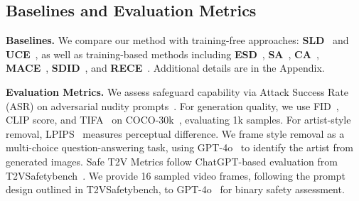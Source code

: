 
\subsection{Baselines and Evaluation Metrics} \textbf{Baselines.} We compare our method with training-free approaches: \textbf{SLD}~\citep{schramowski2023safe} and \textbf{UCE}~\citep{gandikota2024unified}, as well as training-based methods including \textbf{ESD}~\citep{gandikota2023erasing}, \textbf{SA}~\citep{heng2023selective}, \textbf{CA}~\citep{kumari2023ablating}, \textbf{MACE}~\citep{lu2024mace}, \textbf{SDID}~\citep{li2024self}, and \textbf{RECE}~\citep{gong2024reliable}. Additional details are in the Appendix.        





\textbf{Evaluation Metrics.} We assess safeguard capability via Attack Success Rate (ASR) on adversarial nudity prompts~\citep{gong2024reliable}. For generation quality, we use FID~\citep{heusel2017gans}, CLIP score, and TIFA~\citep{hu2023tifa} on COCO-30k~\citep{lin2014microsoft}, evaluating 1k samples. For artist-style removal, LPIPS~\citep{zhang2018unreasonable} measures perceptual difference. We frame style removal as a multi-choice question-answering task, using GPT-4o~\citep{gpt4o} to identify the artist from generated images. Safe T2V Metrics follow ChatGPT-based evaluation from T2VSafetybench~\citep{miao2024t2vsafetybench}. We provide 16 sampled video frames, following the prompt design outlined in T2VSafetybench, to GPT-4o~\citep{gpt4o} for binary safety assessment.


